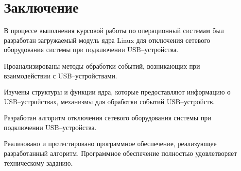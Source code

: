 \chapter*{Заключение}

В процессе выполнения курсовой работы по операционный системам был разработан загружаемый модуль ядра Linux для отключения сетевого оборудования системы при подключении USB--устройства.

Проанализированы методы обработки событий, возникающих при взаимодействии с USB--устройствами.

Изучены структуры и функции ядра, которые предоставляют информацию о USB--устройствах, механизмы для обработки событий USB--устройств. 

Разработан алгоритм отключения сетевого оборудования системы при подключении USB--устройства.

Реализовано и протестировано программное обеспечение, реализующее разработанный алгоритм. Программное обеспечение полностью удовлетворяет техническому заданию.